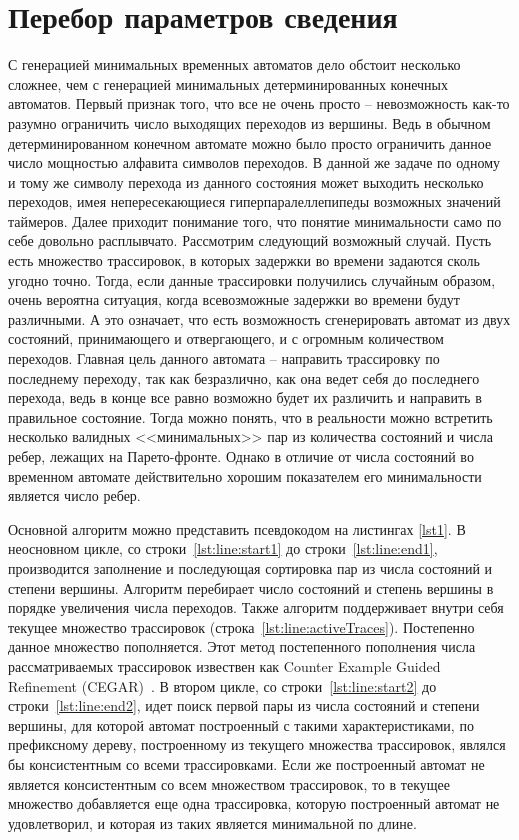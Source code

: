 \documentclass[times,specification,annotation]{itmo-student-thesis}
\begin{document}
\section{Перебор параметров сведения}
С генерацией минимальных временных автоматов дело обстоит несколько сложнее, чем с генерацией минимальных детерминированных конечных автоматов.
Первый признак того, что все не очень просто -- невозможность как-то разумно ограничить число выходящих переходов из вершины. Ведь в обычном детерминированном конечном автомате можно
было просто ограничить данное число мощностью алфавита символов переходов. В данной же задаче по одному и тому же символу перехода из данного состояния может выходить несколько
переходов, имея непересекающиеся гиперпаралеллепипеды возможных значений таймеров.
Далее приходит понимание того, что понятие минимальности само по себе довольно расплывчато. Рассмотрим следующий возможный случай. 
Пусть есть множество трассировок, в которых задержки во времени задаются сколь угодно точно. Тогда, если данные трассировки получились случайным образом,
очень вероятна ситуация, когда всевозможные задержки во времени будут различными. А это означает, что есть возможность сгенерировать автомат из двух состояний, принимающего и отвергающего,
и с огромным количеством переходов. Главная цель данного автомата -- направить трассировку по последнему переходу, так как безразлично, как она ведет себя до последнего перехода, ведь в
конце все равно возможно будет их различить и направить в правильное состояние. Тогда можно понять, что в реальности можно встретить несколько валидных <<минимальных>> пар из количества
состояний и числа ребер, лежащих на Парето-фронте. 
Однако в отличие от числа состояний во временном автомате действительно хорошим показателем его минимальности является число ребер.

Основной алгоритм можно представить псевдокодом на листингах \ref{lst1}.
В неосновном цикле, со строки~\ref{lst:line:start1} до строки~\ref{lst:line:end1}, производится заполнение и последующая сортировка
пар из числа состояний и степени вершины. Алгоритм перебирает число состояний и степень вершины в порядке увеличения числа переходов. 
Также алгоритм поддерживает внутри себя текущее множество трассировок (строка~\ref{lst:line:activeTraces}). Постепенно данное множество пополняется.
Этот метод постепенного пополнения числа рассматриваемых трассировок извествен как Counter Example Guided Refinement (CEGAR)~\cite{cegar}.
В втором цикле, со строки~\ref{lst:line:start2} до строки~\ref{lst:line:end2}, идет поиск первой пары из числа состояний и степени вершины,
для которой автомат построенный с такими характеристиками, по префиксному дереву, построенному из текущего множества трассировок,
являлся бы консистентным со всеми трассировками. Если же построенный автомат не является консистентным со
всем множеством трассировок, то в текущее множество добавляется еще одна трассировка, которую построенный автомат не удовлетворил, и которая из таких является минимальной по длине.
\end{document}
